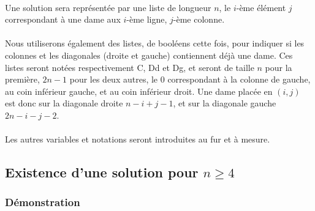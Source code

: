 \documentclass[a4paper]{article}
\begin{document}
\paragraph{}
Une solution sera représentée par une liste de longueur $n$, le $i$-ème élément $j$ correspondant à une dame aux $i$-ème ligne, $j$-ème colonne.

\paragraph{}
Nous utiliserons également des listes, de booléens cette fois, pour indiquer si les colonnes et les diagonales (droite et gauche) contiennent déjà une dame. Ces listes seront notées respectivement C, Dd et Dg, et seront de taille $n$ pour la première, $2n-1$ pour les deux autres, le 0 correspondant à la colonne de gauche, au coin inférieur gauche, et au coin inférieur droit. Une dame placée en $(i,j)$ est donc sur la diagonale droite $n-i+j-1$, et sur la diagonale gauche $2n-i-j-2$.

\paragraph{}
Les autres variables et notations seront introduites au fur et à mesure.

\subsection{Existence d'une solution pour $n\geq 4$}

\subsubsection{Démonstration}

\vspace{0.5em}
\end{document}
